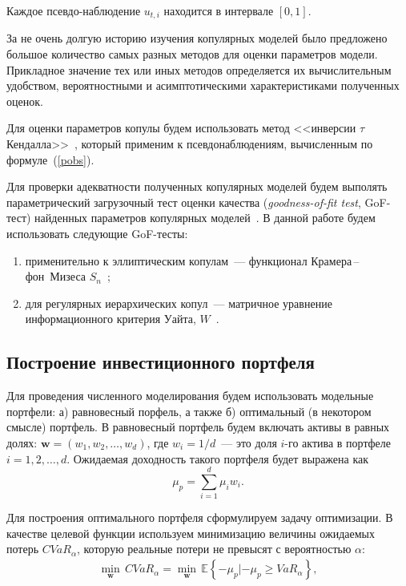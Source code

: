 Каждое псевдо-наблюдение $u_{t,i}$ находится в интервале $[0, 1]$.

За не очень долгую историю изучения копулярных моделей было предложено большое количество самых разных методов для оценки параметров модели.
Прикладное значение тех или иных методов определяется их вычислительным удобством, вероятностными и асимптотическими характеристиками полученных оценок.

Для оценки параметров копулы будем использовать метод <<инверсии $\tau$ Кендалла>>~\cite{Koj2010}, который применим к  псевдо\-наблюдениям, вычисленным по формуле~(\ref{pobs}).

Для проверки адекватности полученных копулярных моделей будем выполять параметрический загрузочный тест оценки качества (\textit{goodness-of-fit test}, GoF-тест) найденных параметров  копулярных моделей~\cite{Gen2009}.
В данной работе будем использовать следующие GoF-тесты: 
\begin{enumerate}[label=\arabic*)]
    \item применительно к эллиптическим копулам~--- функционал Крамера\,--\,фон~Мизеса $S_n$~\cite{Gen2009};
    \item для регулярных иерархических копул~--- матричное уравнение информационного критерия Уайта, $W$~\cite{White1982}.
\end{enumerate}

\subsection{Построение инвестиционного портфеля} 

Для проведения численного моделирования будем использовать модельные портфели: а) равновесный порфель, а также б) оптимальный (в некотором смысле) портфель. 
В равновесный портфель будем включать активы в равных долях: $\textbf{w}=(w_1, w_2, \ldots, w_d)$, где $w_i=1/d$~--- это доля $i$-го актива в портфеле $i=1,2,\ldots, d$.
Ожидаемая доходность такого портфеля будет выражена как
$$\mu_p = \sum_{i=1}^d \mu_i w_i.$$

Для построения оптимального портфеля сформулируем задачу оптимизации. 
В качестве целевой функции используем минимизацию величины ожидаемых потерь $\textit{CVaR}_\alpha$, которую реальные потери не превысят с вероятностью $\alpha$:
\begin{gather} \label{ES}
    \underset{\textbf{w}}{\min} \, \textit{CVaR}_\alpha =
    \underset{\textbf{w}}{\min} \, \mathbb{E}\left\{-\mu_p | -\mu_p \ge VaR_\alpha
    \right\},
\end{gather}

